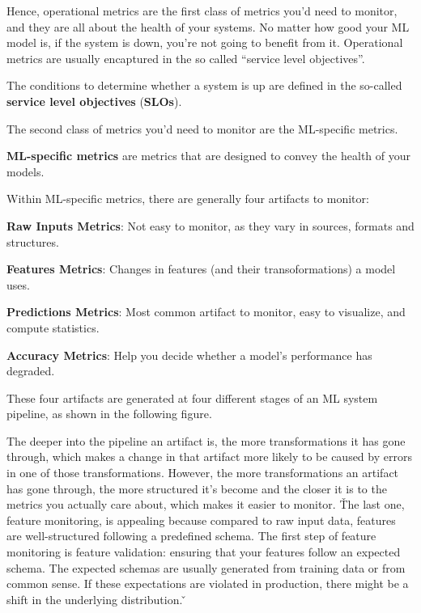 Hence, operational metrics are the first class of metrics you'd need to monitor, and they are all about the health of
your systems. No matter how good your ML model is, if the system is down, you're not going to benefit from it.
Operational metrics are usually encaptured in the so called ``service level objectives''.

The conditions to determine whether a system is up are defined in the so-called \textbf{service level objectives}
(\textbf{SLOs}).
\ed

The second class of metrics you'd need to monitor are the ML-specific metrics.

\textbf{ML-specific metrics} are metrics that are designed to convey the health of your models.
\ed

Within ML-specific metrics, there are generally four artifacts to monitor:
\bit
\item \textbf{Raw Inputs Metrics}: Not easy to monitor, as they vary in sources, formats and structures.
\item \textbf{Features Metrics}: Changes in features (and their transoformations) a model uses.
\item \textbf{Predictions Metrics}: Most common artifact to monitor, easy to visualize, and compute statistics.
\item \textbf{Accuracy Metrics}: Help you decide whether a model's performance has degraded.
\eit

These four artifacts are generated at four different stages of an ML system pipeline, as shown in the following figure.


The deeper into the pipeline an artifact is, the more transformations it has gone through, which makes a change in
that artifact more likely to be caused by errors in one of those transformations. However, the more transformations
an artifact has gone through, the more structured it's become and the closer it is to the metrics you actually care
about, which makes it easier to monitor. \v

The last one, feature monitoring, is appealing because compared to raw input data, features are well-structured
following a predefined schema. The first step of feature monitoring is feature validation: ensuring that your
features follow an expected schema. The expected schemas are usually generated from training data or from common
sense. If these expectations are violated in production, there might be a shift in the underlying distribution. \v

